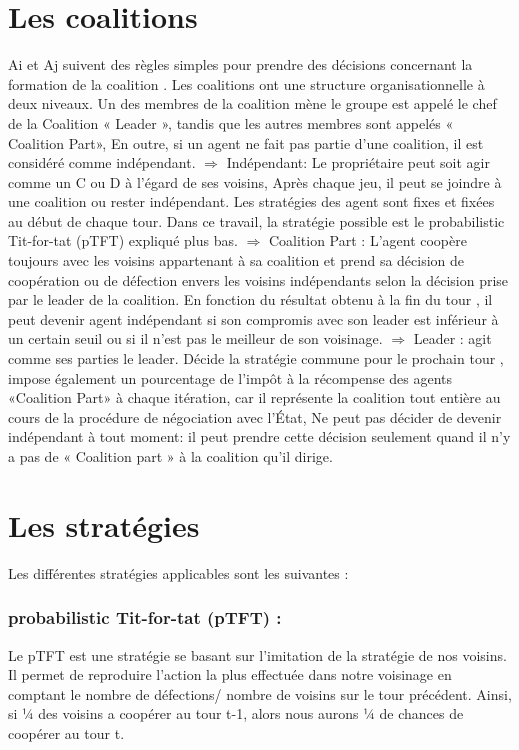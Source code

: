 \documentclass[30pt]{report}
\begin{document}
\part{Les coalitions}
Ai et Aj suivent des règles simples pour prendre des  décisions concernant la formation de la coalition . Les coalitions ont une structure organisationnelle à deux niveaux. Un des membres de la coalition mène le groupe  est appelé le chef de la Coalition « Leader »,  tandis que les autres membres sont appelés « Coalition Part», En outre, si un agent ne fait pas partie d'une coalition, il est considéré comme indépendant.
\newline
\newline
$\Rightarrow$
  Indépendant: Le propriétaire peut soit agir comme un C ou D  à l'égard de ses voisins, Après chaque jeu, il peut se joindre à une coalition ou rester indépendant.  Les stratégies des agent sont fixes et fixées au début de chaque tour. Dans ce travail, la stratégie possible est le probabilistic Tit-for-tat (pTFT) expliqué plus bas.
\newline
\newline
$\Rightarrow$
  Coalition Part :  L'agent coopère toujours avec les voisins appartenant à sa coalition et prend sa décision de coopération ou de défection envers les voisins indépendants selon la décision prise par le leader de la coalition. En fonction du résultat obtenu à la fin du tour , il peut devenir agent indépendant si son compromis avec son leader est inférieur à un certain seuil ou si il n'est pas le meilleur de son voisinage.
\newline
\newline
$\Rightarrow$
  Leader :  agit comme ses parties le leader. Décide la stratégie commune pour le prochain tour , impose également un pourcentage de l'impôt à la récompense des agents «Coalition Part» à chaque itération, car il représente la coalition tout entière au cours de la procédure de négociation avec l'État, Ne peut pas décider de devenir indépendant à tout moment: il peut prendre cette décision seulement quand il n'y a pas de « Coalition part » à la coalition qu'il dirige. 
  \newline
\part{Les stratégies}
Les différentes stratégies applicables sont les suivantes : 
\newline
\section{probabilistic Tit-for-tat (pTFT) :}
Le pTFT est une stratégie se basant sur l'imitation de la stratégie de nos voisins.
\newline
\newline
Il permet de reproduire l'action la plus effectuée dans notre voisinage en comptant le nombre de défections/ nombre de voisins sur le tour précédent.
\newline
\newline
Ainsi, si ¼ des voisins a coopérer au tour t-1, alors nous aurons  ¼  de chances de coopérer au tour t.
\newline
\end{document}
